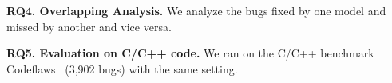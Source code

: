 



\vspace{2pt} {\bf RQ4. Overlapping Analysis.} We analyze the bugs
fixed by one model and missed by another and vice versa.

{\bf RQ5. Evaluation on C/C++ code.} We ran {\tool} on the C/C++ benchmark
Codeflaws~\cite{tan2017codeflaws} (3,902 bugs) with the same
setting.
